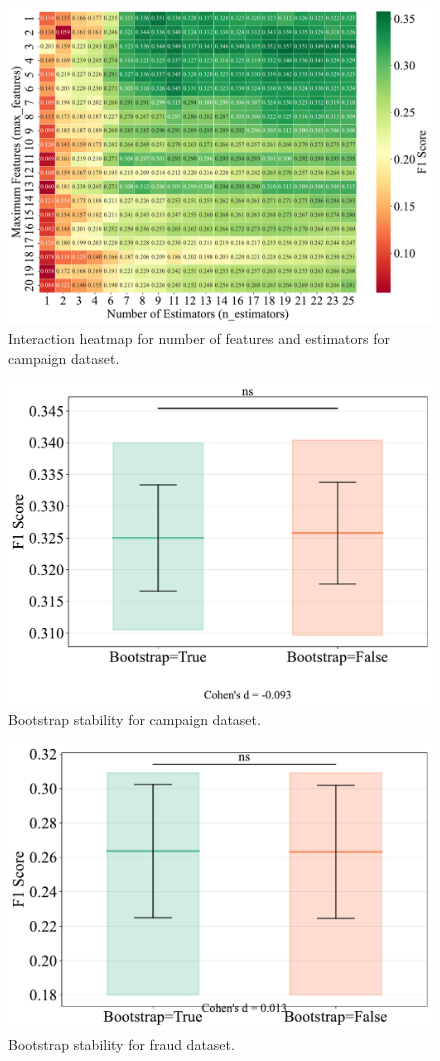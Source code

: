 \documentclass[10pt, conference]{IEEEtran}
\begin{document}
\begin{figure}[H]
	\centering
	\includegraphics[width=0.95\linewidth]{../results/campaign/max_features/interaction_f1_heatmap.pdf}
	\caption{Interaction heatmap for number of features and estimators for campaign dataset.}
	\label{fig:int_hm_campaign}
\end{figure}



\begin{figure}[H]
	\centering
	\includegraphics[width=0.95\linewidth]{../results/campaign/bootstrap/bootstrap_stability_box.pdf}
	\caption{Bootstrap stability for campaign dataset.}
	\label{fig:bootstrap_campaign}
\end{figure}

\begin{figure}[H]
	\centering
	\includegraphics[width=0.95\linewidth]{../results/fraud/bootstrap/bootstrap_stability_box.pdf}
	\caption{Bootstrap stability for fraud dataset.}
	\label{fig:bootstrap_fraud}
\end{figure}
\end{document}

